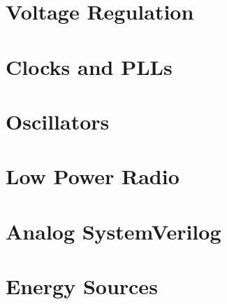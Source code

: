 \documentclass[11pt,twoside,openright]{kaobook}
\begin{document}
\setchapterpreamble[u]{\margintoc}
\chapter{Voltage Regulation}


\setchapterpreamble[u]{\margintoc}
\chapter{Clocks and PLLs}


\setchapterpreamble[u]{\margintoc}
\chapter{Oscillators}


\setchapterpreamble[u]{\margintoc}
\chapter{Low Power Radio}


\setchapterpreamble[u]{\margintoc}
\chapter{Analog SystemVerilog}


\setchapterpreamble[u]{\margintoc}
\chapter{Energy Sources}


%





\backmatter
\end{document}
